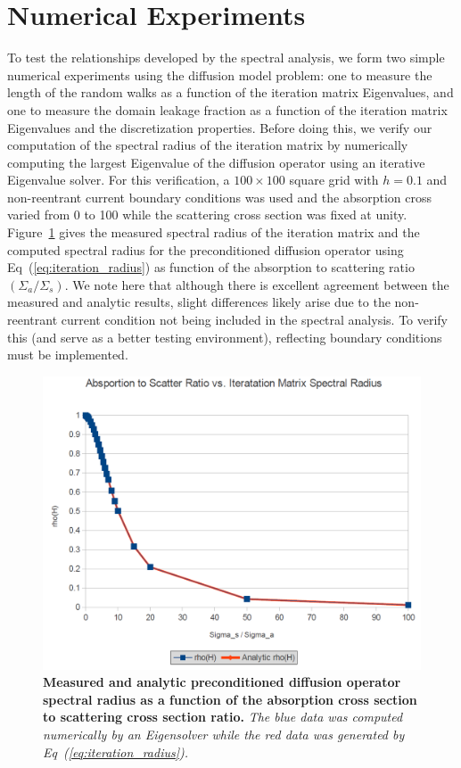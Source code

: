 \documentclass[letterpaper,12pt]{article}
\begin{document}
\section{Numerical Experiments}
To test the relationships developed by the spectral analysis, we form
two simple numerical experiments using the diffusion model problem:
one to measure the length of the random walks as a function of the
iteration matrix Eigenvalues, and one to measure the domain leakage
fraction as a function of the iteration matrix Eigenvalues and the
discretization properties. Before doing this, we verify our
computation of the spectral radius of the iteration matrix by
numerically computing the largest Eigenvalue of the diffusion operator
using an iterative Eigenvalue solver. For this verification, a $100
\times 100$ square grid with $h=0.1$ and non-reentrant current
boundary conditions was used and the absorption cross varied from 0 to
100 while the scattering cross section was fixed at
unity. Figure~\ref{fig:measured_spec_rad} gives the measured spectral
radius of the iteration matrix and the computed spectral radius for
the preconditioned diffusion operator using
Eq~(\ref{eq:iteration_radius}) as function of the absorption to
scattering ratio $(\Sigma_a / \Sigma_s)$. We note here that although
there is excellent agreement between the measured and analytic
results, slight differences likely arise due to the non-reentrant
current condition not being included in the spectral analysis. To
verify this (and serve as a better testing environment), reflecting
boundary conditions must be implemented.
\begin{figure}[t!]
  \begin{center}
    \includegraphics[width=5in,clip]{measured_spec_rad.png}
  \end{center}
  \caption{\textbf{Measured and analytic preconditioned diffusion
      operator spectral radius as a function of the absorption cross
      section to scattering cross section ratio.} \textit{The blue
      data was computed numerically by an Eigensolver while the red
      data was generated by Eq~(\ref{eq:iteration_radius}).}}
  \label{fig:measured_spec_rad}
\end{figure}
\end{document}
